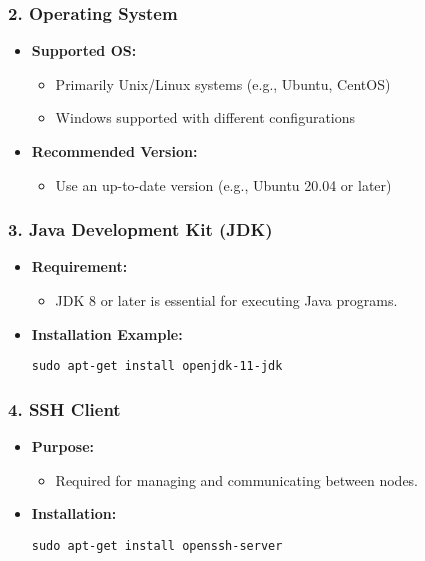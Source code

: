 \documentclass{beamer}
\begin{document}
\begin{frame}[fragile]
    \frametitle{2. Operating System}
    \begin{itemize}
        \item \textbf{Supported OS:}
            \begin{itemize}
                \item Primarily Unix/Linux systems (e.g., Ubuntu, CentOS)
                \item Windows supported with different configurations
            \end{itemize}
        \item \textbf{Recommended Version:}
            \begin{itemize}
                \item Use an up-to-date version (e.g., Ubuntu 20.04 or later)
            \end{itemize}
    \end{itemize}
\end{frame}

\begin{frame}[fragile]
    \frametitle{3. Java Development Kit (JDK)}
    \begin{itemize}
        \item \textbf{Requirement:} 
            \begin{itemize}
                \item JDK 8 or later is essential for executing Java programs.
            \end{itemize}
        \item \textbf{Installation Example:}
            \begin{lstlisting}
sudo apt-get install openjdk-11-jdk
            \end{lstlisting}
    \end{itemize}
\end{frame}

\begin{frame}[fragile]
    \frametitle{4. SSH Client}
    \begin{itemize}
        \item \textbf{Purpose:} 
            \begin{itemize}
                \item Required for managing and communicating between nodes.
            \end{itemize}
        \item \textbf{Installation:}
            \begin{lstlisting}
sudo apt-get install openssh-server
            \end{lstlisting}
    \end{itemize}
\end{frame}
\end{document}

